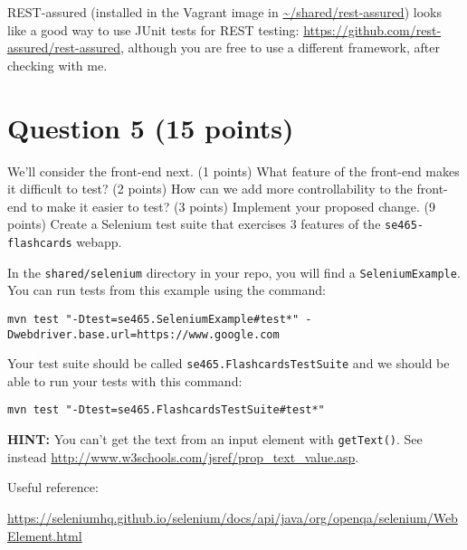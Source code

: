 \documentclass[10pt,hidelinks]{article}
\begin{document}
REST-assured (installed in the Vagrant image in \url{~/shared/rest-assured})
looks like a good way to use JUnit tests for REST
testing: \url{https://github.com/rest-assured/rest-assured}, although
you are free to use a different framework, after checking with me.

\section*{Question 5 (15 points)}
We'll consider the front-end next. (1 points) What feature of the front-end
makes it difficult to test? (2 points) How can we add more controllability
to the front-end to make it easier to test? (3 points) Implement your proposed
change. (9 points) Create a Selenium test suite that exercises 3 features of the
{\tt se465-flashcards} webapp.

In the {\tt shared/selenium} directory in your repo, you will find a {\tt SeleniumExample}.
You can run tests from this example using the command:

\begin{verbatim}
mvn test "-Dtest=se465.SeleniumExample#test*" -Dwebdriver.base.url=https://www.google.com
\end{verbatim}

Your test suite should be called {\tt se465.FlashcardsTestSuite} and we should be able to run your tests with this command:

\begin{verbatim}
mvn test "-Dtest=se465.FlashcardsTestSuite#test*"
\end{verbatim}

{\bf HINT:} You can't get the text from an input element with {\tt getText()}. See instead
\url{http://www.w3schools.com/jsref/prop_text_value.asp}.

Useful reference:

\url{https://seleniumhq.github.io/selenium/docs/api/java/org/openqa/selenium/WebElement.html}
\end{document}
